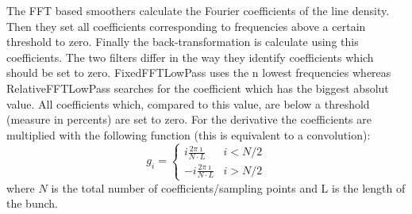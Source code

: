 The FFT based smoothers calculate the Fourier coefficients of the line density. Then they set all coefficients corresponding to frequencies above a certain threshold to zero. Finally the back-transformation is calculate using this coefficients. The two filters differ in the way they identify coefficients which should be set to zero. FixedFFTLowPass uses the n lowest frequencies whereas RelativeFFTLowPass searches for the coefficient which has the biggest absolut value. All coefficients which, compared to this value, are below a threshold (measure in percents) are set to zero. For the derivative the coefficients are multiplied with the following function (this is equivalent to a convolution): 
$$g_{i} = 
\begin{cases}
i \frac{2\pi \imath}{N\cdot L} & i < N/2 \\
-i \frac{2\pi \imath}{N\cdot L} & i > N/2
\end{cases}$$
where $N$ is the total number of coefficients/sampling points and L is the length of the bunch.
